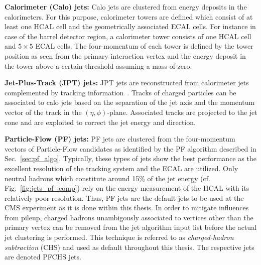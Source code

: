 \begin{description}
 \item \textbf{Calorimeter (Calo) jets:} Calo jets are clustered from energy deposits in the calorimeters. For this purpose, calorimeter towers are defined which consist of at least one HCAL cell and the geometrically associated ECAL cells. For instance in case of the barrel detector region, a calorimeter tower consists of one HCAL cell and $\mathrm{5 \times 5}$ ECAL cells. The four-momentum of each tower is defined by the tower position as seen from the primary interaction vertex and the energy deposit in the tower above a certain threshold assuming a mass of zero. 
 \item \textbf{Jet-Plus-Track (JPT) jets:} JPT jets are reconstructed from calorimeter jets complemented by tracking information~\cite{CMS-PAS-JME-09-002}. Tracks of charged particles can be associated to calo jets based on the separation of the jet axis and the momentum vector of the track in the $(\eta,\phi)$-plane. Associated tracks are projected to the jet cone and are exploited to correct the jet energy and direction. 
 \item \textbf{Particle-Flow (PF) jets:} PF jets are clustered from the four-momentum vectors of Particle-Flow candidates as identified by the PF algorithm described in Sec.~\ref{sec:pf_algo}. Typically, these types of jets show the best performance as the excellent resolution of the tracking system and the ECAL are utilized. Only neutral hadrons which constitute around 15\% of the jet energy (cf. Fig.~\ref{fig:jets_pf_comp}) rely on the energy measurement of the HCAL with its relatively poor resolution. Thus, PF jets are the default jets to be used at the CMS experiment as it is done within this thesis. In order to mitigate influences from pileup, charged hadrons unambigously associated to vertices other than the primary vertex can be removed from the jet algorithm input list before the actual jet clustering is performed. This technique is referred to as \textit{charged-hadron subtraction} (CHS) and used as default throughout this thesis. The respective jets are denoted PFCHS jets.
\end{description}

